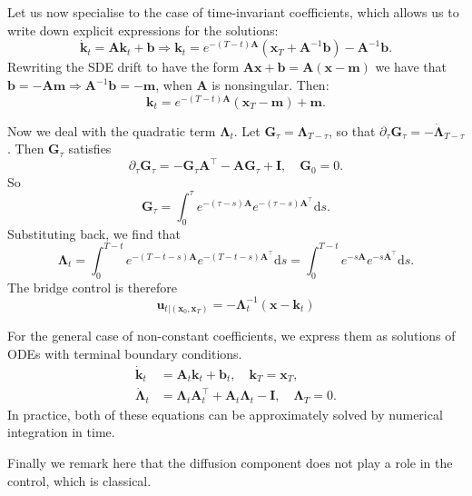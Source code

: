 \documentclass{article}
\newcommand{\diff}{\mathrm{d}}
\newcommand{\Id}{\mathbf{I}}
\theoremstyle{newstyle}
\begin{document}
Let us now specialise to the case of time-invariant coefficients, which allows us to write down explicit expressions for the solutions:
\begin{equation}
  \dot{\bm{k}}_t = \bm{A} \bm{k}_t + \bm{b} \Longrightarrow \bm{k}_t = e^{-(T - t) \bm{A}} (\bm{x}_T + \bm{A}^{-1} \bm{b}) - \bm{A}^{-1} \bm{b}.
\end{equation}
Rewriting the SDE drift to have the form $\bm{Ax} + \bm{b} = \bm{A}(\bm{x} - \bm{m})$ we have that $\bm{b} = -\bm{A} \bm{m} \Longrightarrow \bm{A}^{-1} \bm{b} = -\bm{m}$, when $\bm{A}$ is nonsingular. Then:
\begin{equation}
  \bm{k}_t = e^{-(T - t) \bm{A}} (\bm{x}_T - \bm{m}) + \bm{m}.
\end{equation}

Now we deal with the quadratic term $\bm{\Lambda}_t$. Let $\bm{G}_\tau = \bm{\Lambda}_{T - \tau}$, so that $\partial_\tau \bm{G}_\tau = -\dot{\bm{\Lambda}}_{T - \tau}$. Then $\bm{G}_\tau$ satisfies
\begin{equation}
  \partial_\tau \bm{G}_\tau = -\bm{G}_\tau \bm{A}^\top - \bm{A} \bm{G}_\tau + \Id, \quad \bm{G}_0 = 0. 
\end{equation}
So
\begin{equation}
  \bm{G}_\tau = \int_0^\tau e^{-(\tau - s)\bm{A}} e^{-(\tau-s)\bm{A}^\top} \diff s. 
\end{equation}
Substituting back, we find that
\begin{equation}
  \bm{\Lambda}_t = \int_0^{T-t} e^{-(T-t-s) \bm{A}} e^{-(T-t-s)\bm{A}^\top} \diff s = \int_0^{T-t} e^{-s \bm{A}} e^{-s \bm{A}^\top} \diff s. 
\end{equation}
The bridge control is therefore
\begin{equation}
  \bm{u}_{t | {(\bm{x}_0, \bm{x}_T)}} = -\bm{\Lambda}_t^{-1} (\bm{x} - \bm{k}_t)
\end{equation}

For the general case of non-constant coefficients, we express them as solutions of ODEs with terminal boundary conditions. 
\begin{align}
  \dot{\bm{k}}_t &= \bm{A}_t \bm{k}_t + \bm{b}_t, \quad \bm{k}_T = \bm{x}_T, \\
  \dot{\bm{\Lambda}}_t &= \bm{\Lambda}_t \bm{A}_t^\top + \bm{A}_t \bm{\Lambda}_t - \bm{I}, \quad \bm{\Lambda}_T = 0.
\end{align}
In practice, both of these equations can be approximately solved by numerical integration in time.

Finally we remark here that the diffusion component does not play a role in the control, which is classical. 
\end{document}
